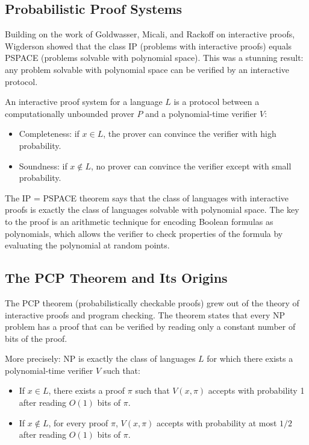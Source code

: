 \subsection{Probabilistic Proof Systems}

Building on the work of Goldwasser, Micali, and Rackoff on interactive proofs, Wigderson showed that the class IP (problems with interactive proofs) equals PSPACE (problems solvable with polynomial space). This was a stunning result: any problem solvable with polynomial space can be verified by an interactive protocol.

An interactive proof system for a language $L$ is a protocol between a computationally unbounded prover $P$ and a polynomial-time verifier $V$:
\begin{itemize}
\item Completeness: if $x \in L$, the prover can convince the verifier with high probability.
\item Soundness: if $x \notin L$, no prover can convince the verifier except with small probability.
\end{itemize}

The IP = PSPACE theorem says that the class of languages with interactive proofs is exactly the class of languages solvable with polynomial space. The key to the proof is an arithmetic technique for encoding Boolean formulas as polynomials, which allows the verifier to check properties of the formula by evaluating the polynomial at random points.

\subsection{The PCP Theorem and Its Origins}

The PCP theorem (probabilistically checkable proofs) grew out of the theory of interactive proofs and program checking. The theorem states that every NP problem has a proof that can be verified by reading only a constant number of bits of the proof.

More precisely: NP is exactly the class of languages $L$ for which there exists a polynomial-time verifier $V$ such that:
\begin{itemize}
\item If $x \in L$, there exists a proof $\pi$ such that $V(x, \pi)$ accepts with probability 1 after reading $O(1)$ bits of $\pi$.
\item If $x \notin L$, for every proof $\pi$, $V(x, \pi)$ accepts with probability at most $1/2$ after reading $O(1)$ bits of $\pi$.
\end{itemize}

